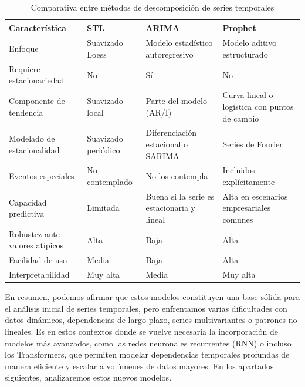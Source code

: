 \begin{table}[!ht]
    \centering
    \begingroup
    \renewcommand{\arraystretch}{1.055}
    \begin{tabular}{P{3.3cm} | P{2.5cm} P{2.5cm} P{2.5cm}}
        \toprule
        \textbf{Característica}        & \textbf{STL}        & \textbf{ARIMA}                             & \textbf{Prophet}                              \\
        \midrule
        Enfoque                        & Suavizado Loess     & Modelo estadístico autoregresivo           & Modelo aditivo estructurado                   \\
        Requiere estacionariedad       & No                  & Sí                                         & No                                            \\
        Componente de tendencia        & Suavizado local     & Parte del modelo (AR/I)                    & Curva lineal o logística con puntos de cambio \\
        Modelado de estacionalidad     & Suavizado periódico & Diferenciación estacional o SARIMA & Series de Fourier \\
        Eventos especiales             & No contemplado      & No los contempla                           & Incluidos explícitamente                      \\
        Capacidad predictiva           & Limitada            & Buena si la serie es estacionaria y lineal & Alta en escenarios empresariales comunes      \\
        Robustez ante valores atípicos & Alta                & Baja                                       & Alta                                          \\
        Facilidad de uso               & Media               & Baja                                       & Alta                                          \\
        Interpretabilidad              & Muy alta            & Media                                      & Muy alta                                      \\
        \bottomrule
    \end{tabular}
    \caption{Comparativa entre métodos de descomposición de series temporales}
    \label{tab:modelsadit}
    \endgroup
\end{table}



En resumen, podemos afirmar que estos modelos constituyen una base sólida para el análisis inicial de series temporales, pero enfrentamos varias dificultades con datos dinámicos, dependencias de largo plazo, series multivariantes o patrones no lineales. Es en estos contextos donde se vuelve necesaria la incorporación de modelos más avanzados, como las {redes neuronales recurrentes (RNN)} o incluso los {Transformers}, que permiten modelar dependencias temporales profundas de manera eficiente y escalar a volúmenes de datos mayores. En los apartados siguientes, analizaremos estos nuevos modelos.

